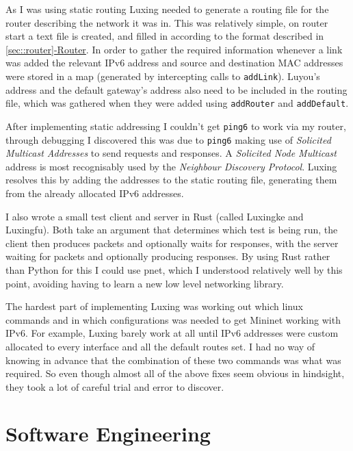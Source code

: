 \documentclass[12pt,a4paper,twoside,openright]{report}
\begin{document}
\bigskip

As I was using static routing Luxing needed to generate a routing file for the router describing the network it was in.  This was relatively simple, on router start a text file is created, and filled in according to the format described in \ref{sec::router}\hyperref[sec::router]{-Router}.  In order to gather the required information whenever a link was added the relevant IPv6 address and source and destination MAC addresses were stored in a map (generated by intercepting calls to \verb!addLink!).  Luyou's address and the default gateway's address also need to be included in the routing file, which was gathered when they were added using \verb!addRouter! and \verb!addDefault!.

\bigskip

After implementing static addressing I couldn't get \verb!ping6! to work via my router, through debugging I discovered this was due to \verb!ping6! making use of \textit{Solicited Multicast Addresses} to send requests and responses. A \textit{Solicited Node Multicast} address is most recognisably used by the \textit{Neighbour Discovery Protocol}\cite{ndp_rfc}. Luxing resolves this by adding the addresses to the static routing file, generating them from the already allocated IPv6 addresses.

\bigskip

I also wrote a small test client and server in Rust (called Luxingke and Luxingfu).  Both take an argument that determines which test is being run, the client then produces packets and optionally waits for responses, with the server waiting for packets and optionally producing responses.  By using Rust rather than Python for this I could use pnet, which I understood relatively well by this point, avoiding having to learn a new low level networking library.

\bigskip

The hardest part of implementing Luxing was working out which linux commands and in which configurations was needed to get Mininet working with IPv6.  For example, Luxing barely work at all until IPv6 addresses were custom allocated to every interface and all the default routes set.  I had no way of knowing in advance that the combination of these two commands was what was required.  So even though almost all of the above fixes seem obvious in hindsight, they took a lot of careful trial and error to discover.

\section{Software Engineering}
\label{sec::soft_eng}
\end{document}
